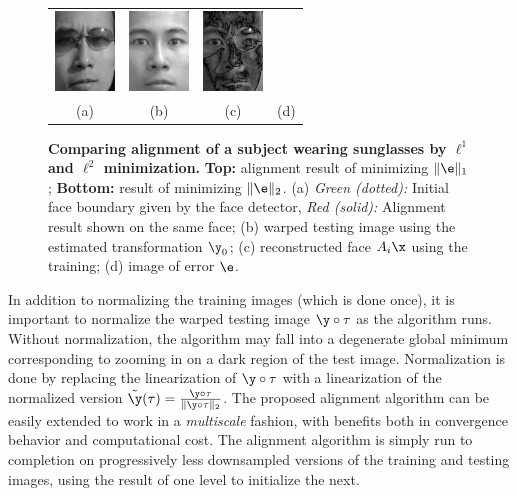 \begin{figure}
{\begin{tabular}{cccc}
\includegraphics[height=\tempheight]{figures_pami/y_warp_L2} &
\includegraphics[height=\tempheight]{figures_pami/y_hat_L2} &
\includegraphics[height=\tempheight]{figures_pami/e_L2} \\
(a) & (b) & (c) & (d)
\end{tabular}}
\caption{\small{\bf Comparing alignment of a subject wearing sunglasses by
$\ell^1$ and $\ell^2$ minimization.}
{\bf Top:} alignment result of minimizing $\|\e\|_1$; {\bf Bottom:}
result of minimizing $\|\e\|_2$. (a) {\em Green (dotted):} Initial face boundary
given by the face detector, {\em Red (solid):} Alignment result shown on the same
face; (b) warped testing image using the estimated transformation $\y_0$;
(c) reconstructed face $A_i\x$ using the training; (d) image of error $\e$. }\label{fig:L1-L2-align}
\end{figure}

In addition to normalizing the training images (which is done
once), it is important to normalize the warped testing image
$\y \circ \tau$ as the algorithm runs.  Without normalization,
the algorithm may fall into a degenerate global minimum
corresponding to zooming in on a dark region of the test
image.  Normalization is done by replacing the linearization of
$\y \circ \tau$ with a linearization of the normalized version
$\tilde \y(\tau) = \frac{\y \circ \tau}{\|\y \circ \tau\|_2}$.
The proposed alignment algorithm can be easily extended to work
in a {\em multiscale} fashion, with benefits both in
convergence behavior and computational cost.  The alignment
algorithm is simply run to completion on progressively less
downsampled versions of the training and testing images, using
the result of one level to initialize the next.

